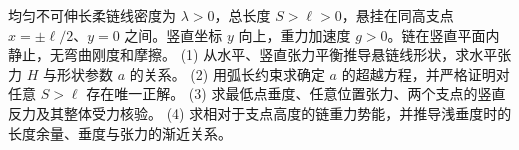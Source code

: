 均匀不可伸长柔链线密度为 \(\lambda>0\)，总长度 \(S>\ell>0\)，悬挂在同高支点 \(x=\pm\ell/2\)、\(y=0\) 之间。竖直坐标 \(y\) 向上，重力加速度 \(g>0\)。链在竖直平面内静止，无弯曲刚度和摩擦。
(1) 从水平、竖直张力平衡推导悬链线形状，求水平张力 \(H\) 与形状参数 \(a\) 的关系。
(2) 用弧长约束求确定 \(a\) 的超越方程，并严格证明对任意 \(S>\ell\) 存在唯一正解。
(3) 求最低点垂度、任意位置张力、两个支点的竖直反力及其整体受力核验。
(4) 求相对于支点高度的链重力势能，并推导浅垂度时的长度余量、垂度与张力的渐近关系。
